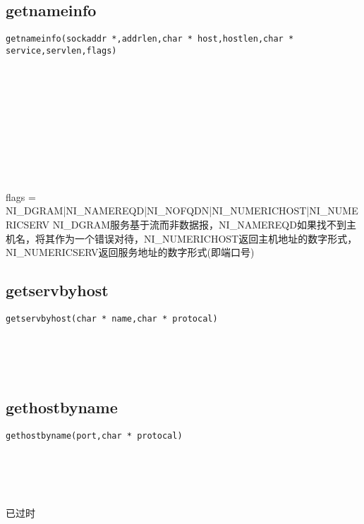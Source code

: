 \documentclass[10pt,a4paper]{article}
\begin{document}
\subsection{getnameinfo}
\begin{spacing}{2.0}
\lstset{language=C,numbers=none}
\begin{lstlisting}
getnameinfo(sockaddr *,addrlen,char * host,hostlen,char * service,servlen,flags)
\end{lstlisting}
{\large\color[rgb]{0.2,0.4,0.6}{*:}} \\
{\large\color[rgb]{0.2,0.4,0.6}{addrlen:}} \\
{\large\color[rgb]{0.2,0.4,0.6}{host:}} \\
{\large\color[rgb]{0.2,0.4,0.6}{hostlen:}} \\
{\large\color[rgb]{0.2,0.4,0.6}{service:}} \\
{\large\color[rgb]{0.2,0.4,0.6}{servlen:}} \\
{\large\color[rgb]{0.2,0.4,0.6}{flags:}}
\paragraph{ \ \ }flags = NI\_DGRAM|NI\_NAMEREQD|NI\_NOFQDN|NI\_NUMERICHOST|NI\_NUMERICSERV NI\_DGRAM服务基于流而非数据报，NI\_NAMEREQD如果找不到主机名，将其作为一个错误对待，NI\_NUMERICHOST返回主机地址的数字形式，NI\_NUMERICSERV返回服务地址的数字形式(即端口号)
\end{spacing}

\subsection{getservbyhost}
\begin{spacing}{2.0}
\lstset{language=C,numbers=none}
\begin{lstlisting}
getservbyhost(char * name,char * protocal)
\end{lstlisting}
{\large\color[rgb]{0.2,0.4,0.6}{name:}} \\
{\large\color[rgb]{0.2,0.4,0.6}{protocal:}}
\paragraph{ \ \ }
\end{spacing}

\subsection{gethostbyname}
\begin{spacing}{2.0}
\lstset{language=C,numbers=none}
\begin{lstlisting}
gethostbyname(port,char * protocal)
\end{lstlisting}
{\large\color[rgb]{0.2,0.4,0.6}{port:}} \\
{\large\color[rgb]{0.2,0.4,0.6}{protocal:}}
\paragraph{ \ \ }已过时
\end{spacing}
\end{document}
